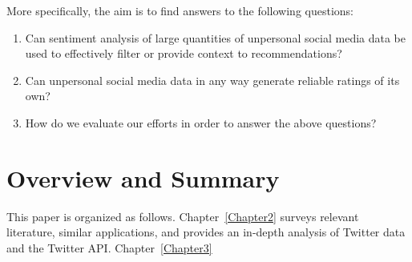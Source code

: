 More specifically, the aim is to find answers to the following questions:

\begin{enumerate}
  \item Can sentiment analysis of large quantities of unpersonal social media data be used to effectively filter or provide context to recommendations?
  \item Can unpersonal social media data in any way generate reliable ratings of its own?
  \item How do we evaluate our efforts in order to answer the above questions?
\end{enumerate}


\section{Overview and Summary}

This paper is organized as follows.
Chapter~\ref{Chapter2} surveys relevant literature, similar applications, and provides an in-depth analysis of Twitter data and the Twitter API.
Chapter~\ref{Chapter3} 

